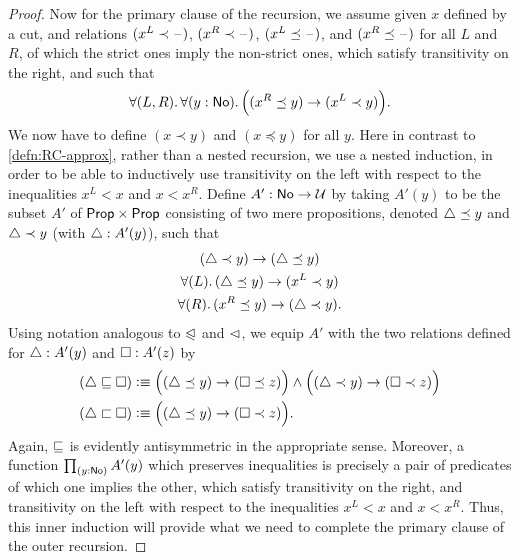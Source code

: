 \begin{proof}
  Now for the primary clause of the recursion, we assume given $x$ defined by a cut, and relations $(x^L \prec \mathord{\hspace{1pt}\text{--}\hspace{1pt}})$, $(x^R \prec \mathord{\hspace{1pt}\text{--}\hspace{1pt}})$, $(x^L \preceq \mathord{\hspace{1pt}\text{--}\hspace{1pt}})$, and $(x^R \preceq \mathord{\hspace{1pt}\text{--}\hspace{1pt}})$ for all $L$ and $R$, of which the strict ones imply the non-strict ones, which satisfy transitivity on the right, and such that
  \begin{equation}\label{eq:NO-prec-outer-IH}
    \fall{L,R}{y:\NO}\Big( (x^R\preceq y) \to (x^L \prec y) \Big).
  \end{equation}
  We now have to define $(x\prec y)$ and $(x\preceq y)$ for all $y$.
  Here in contrast to \cref{defn:RC-approx}, rather than a nested recursion, we use a nested induction, in order to be able to inductively use transitivity on the left with respect to the inequalities $x^L<x$ and $x<x^R$.
  Define $A':\mathsf{No}\to\mathcal{U}$ by taking $A'(y)$ to be the subset $A'$ of $\mathsf{Prop}\times\mathsf{Prop}$ consisting of two mere propositions, denoted $\triangle\preceq y$ and $\triangle\prec y$ (with $\triangle:A'(y)$), such that
  \begin{gather}
    (\tlt y) \to (\tle y)\\
    \fall{L} (\tle y)\to (x^L\prec y) \label{eq:NO-prec-IHL}\\
    \fall{R} (x^R \preceq y) \to (\tlt y) \label{eq:NO-prec-IHR}.
  \end{gather}
  Using notation analogous to $\trianglelefteqslant$ and $\vartriangleleft$, we equip $A'$ with the two relations defined for $\triangle:A'(y)$ and $\square:A'(z)$ by
  \begin{align*}
    (\tlname \bble \tlbname) &\defeq
    \Big((\tle y) \to (\tleb z)\Big) \land \Big((\tlt y) \to (\tltb z)\Big)\\
    (\tlname \bblt \tlbname) &\defeq
    \Big((\tle y) \to (\tltb z)\Big). %
  \end{align*}
  Again, $\sqsubseteq$ is evidently antisymmetric in the appropriate sense.
  Moreover, a function $\prd{y:\NO} A'(y)$ which preserves inequalities is precisely a pair of predicates of which one implies the other, which satisfy transitivity on the right, and transitivity on the left with respect to the inequalities $x^L<x$ and $x<x^R$.
  Thus, this inner induction will provide what we need to complete the primary clause of the outer recursion.


\end{proof}
